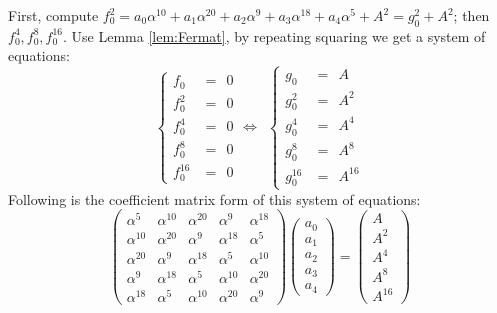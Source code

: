 \begin{Example}
First, compute $f_0^2= a_0\alpha^{10}+a_1\alpha^{20}+a_2\alpha^{9}+a_3\alpha^{18}+a_4\alpha^{5}+A^2 = g_0^2 + A^2$;
then $f_0^4, f_0^8, f_0^{16}$. Use Lemma \ref{lem:Fermat}, by repeating squaring we get a system of equations:
\begin{displaymath}
  \begin{cases}
  f_0  &=\ \  0\\
  f_0^2 & =\ \  0\\
  f_0^4  &=\ \  0\\
  f_0^8  &=\ \  0\\
  f_0^{16} & =\ \ 0
  \end{cases}
\Longleftrightarrow\ \
\begin{cases}
  g_0 & =\ \  A\\
  g_0^2 & =\ \  A^2\\
  g_0^4 & =\ \  A^4\\
  g_0^8 & =\ \  A^8\\
  g_0^{16} & =\ \  A^{16}
  \end{cases}
\end{displaymath}
Following is the coefficient matrix form of this system of equations:
\begin{displaymath}
\begin{pmatrix}
\alpha^5 & \alpha^{10} & \alpha^{20} & \alpha^9 & \alpha^{18} \\
\alpha^{10} & \alpha^{20} & \alpha^9 & \alpha^{18} & \alpha^5 \\
\alpha^{20} & \alpha^9 & \alpha^{18} & \alpha^5 & \alpha^{10} \\
\alpha^9 & \alpha^{18} & \alpha^5 & \alpha^{10} & \alpha^{20} \\
\alpha^{18} & \alpha^5 & \alpha^{10} & \alpha^{20} & \alpha^9 
\end{pmatrix}
\begin{pmatrix}
a_0\\
a_1\\
a_2\\
a_3\\
a_4
\end{pmatrix}
=
\begin{pmatrix}
A\\
A^2\\
A^4\\
A^8\\
A^{16}
\end{pmatrix}
\end{displaymath}


\end{Example}
